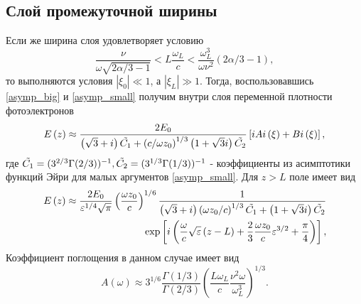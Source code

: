 \documentclass[12pt,a4paper]{article}
\numberwithin{equation}{section}
\begin{document}
\subsection{Слой промежуточной ширины}
Если же ширина слоя удовлетворяет условию 
\begin{equation}
    \label{diel_mid}
    \frac{\nu}{\omega\sqrt{2\alpha/3-1}}<L\frac{\omega_L}{c}<\frac{\omega_L^3}{\omega\nu^2}\left(2\alpha/3-1\right),
\end{equation}
то выполняются условия $|\xi_0|\ll 1$, а $|\xi_L|\gg 1$. Тогда, воспользовавшись \eqref{asymp_big} и \eqref{asymp_small} получим внутри слоя переменной плотности фотоэлектронов 
\begin{equation}
    \label{E1_diel_mid}
    E\left(z\right) \approx \frac{2E_0}{\left(\sqrt{3}+i\right)\Tilde{C_1}+\left(c/\omega z_0\right)^{1/3}\left(1+\sqrt{3}i\right)\Tilde{C_2}}\left[iAi\left(\xi\right)+Bi\left(\xi\right)\right],
\end{equation}
где $\Tilde{C_1} = (3^{2/3}\Gamma(2/3))^{-1},\Tilde{C_2} = (3^{1/3}\Gamma(1/3))^{-1}$ - коэффициенты из асимптотики функций Эйри для малых аргументов \eqref{asymp_small}. 
Для $z>L$ поле имеет вид
\begin{eqnarray}
    E\left(z\right) \approx \frac{2E_0}{\varepsilon^{1/4}\sqrt{\pi}}\left(\frac{\omega z_0}{c}\right)^{1/6}\frac{1}{\left(\sqrt{3}+i\right)\left(\omega z_0/c\right)^{1/3}\Tilde{C_1}+\left(1+\sqrt{3}i\right)\Tilde{C_2}} \nonumber \\
    \exp\left[i\left(\frac{\omega}{c}\sqrt{\varepsilon}\left(z-L\right)+\frac{2}{3}\frac{\omega z_0}{c}\varepsilon^{3/2}+\frac{\pi}{4}\right)\right],
\label{E2_diel_mid}
\end{eqnarray}
Коэффициент поглощения в данном случае имеет вид
\begin{equation}
    \label{a_diel_mid}
    A\left(\omega\right) \approx 3^{1/6}\frac{\Gamma(1/3)}{\Gamma(2/3)}\left(\frac{L\omega_L}{c}\frac{\nu^2\omega}{\omega_L^3}\right)^{1/3}.
\end{equation}
\end{document}
